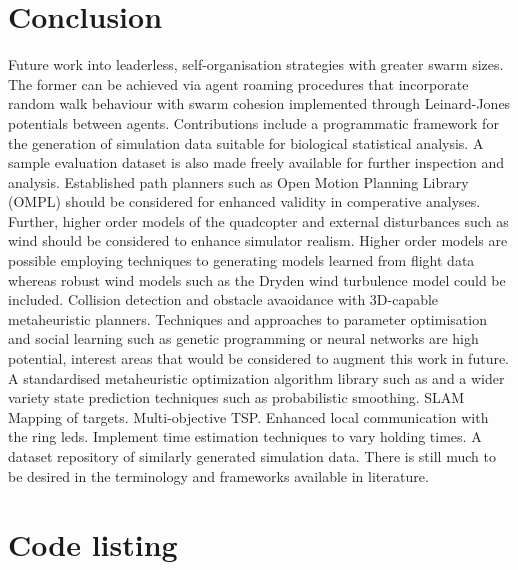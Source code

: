 \documentclass{report}
\begin{document}
\chapter{Conclusion} \label{conclusion}
Future work into leaderless, self-organisation strategies with greater swarm sizes. The former can be achieved via agent roaming procedures that incorporate random walk behaviour with swarm cohesion implemented through Leinard-Jones potentials between agents.
Contributions include a programmatic framework for the generation of simulation data suitable for biological statistical analysis. A sample evaluation dataset is also made freely available for further inspection and analysis. Established path planners such as Open Motion Planning Library (OMPL) \cite{Sucan2012} should be considered for enhanced validity in comperative analyses. Further, higher order models of the quadcopter and external disturbances such as wind should be considered to enhance simulator realism. Higher order models are possible employing techniques to generating models learned from flight data \cite{Symington2014} whereas robust wind models such as the Dryden wind turbulence model \cite{Dryden} could be included. Collision detection and obstacle avaoidance with 3D-capable metaheuristic planners. Techniques and approaches to parameter optimisation and social learning such as genetic programming or neural networks are high potential, interest areas that would be considered to augment this work in future.
A standardised metaheuristic optimization algorithm library such as \cite{James2018} and a wider variety state prediction techniques such as probabilistic smoothing.
SLAM Mapping of targets.
Multi-objective TSP.
Enhanced local communication with the ring leds.
Implement time estimation techniques to vary holding times.
A dataset repository of similarly generated simulation data.
There is still much to be desired in the terminology and frameworks available in literature.

\appendix


\chapter{Code listing}
\end{document}
